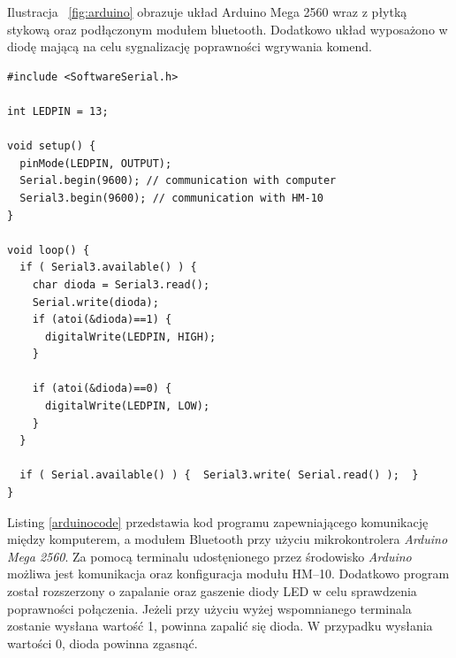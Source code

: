 Ilustracja ~\ref{fig:arduino} obrazuje układ Arduino Mega 2560 wraz z płytką stykową oraz podłączonym modułem bluetooth. Dodatkowo układ wyposażono w diodę mającą na celu sygnalizację poprawności wgrywania komend.

\begin{minipage}{\textwidth}
	\begin{lstlisting}[label=arduinocode,caption=Kod programu umożliwiającego konifugrację modułu Bluetooth HM–10.]
#include <SoftwareSerial.h>
 
int LEDPIN = 13;

void setup() {
  pinMode(LEDPIN, OUTPUT);
  Serial.begin(9600); // communication with computer
  Serial3.begin(9600); // communication with HM-10  
}
 
void loop() {
  if ( Serial3.available() ) {
    char dioda = Serial3.read();
    Serial.write(dioda);
    if (atoi(&dioda)==1) {
      digitalWrite(LEDPIN, HIGH);
    }
    
    if (atoi(&dioda)==0) {
      digitalWrite(LEDPIN, LOW);
    }
  }
  
  if ( Serial.available() ) {  Serial3.write( Serial.read() );  }  
}
	\end{lstlisting}
\end{minipage}
 
Listing \ref{arduinocode} przedstawia kod programu zapewniającego komunikację między komputerem, a modułem Bluetooth przy użyciu mikrokontrolera \textit{Arduino Mega 2560}.  Za pomocą terminalu udostęnionego przez środowisko \textit{Arduino} możliwa jest komunikacja oraz konfiguracja modułu HM–10. Dodatkowo program został rozszerzony o zapalanie oraz gaszenie diody LED w celu sprawdzenia poprawności połączenia. Jeżeli przy użyciu wyżej wspomnianego terminala zostanie wysłana wartość 1, powinna zapalić się dioda. W przypadku wysłania wartości 0, dioda powinna zgasnąć.


 

